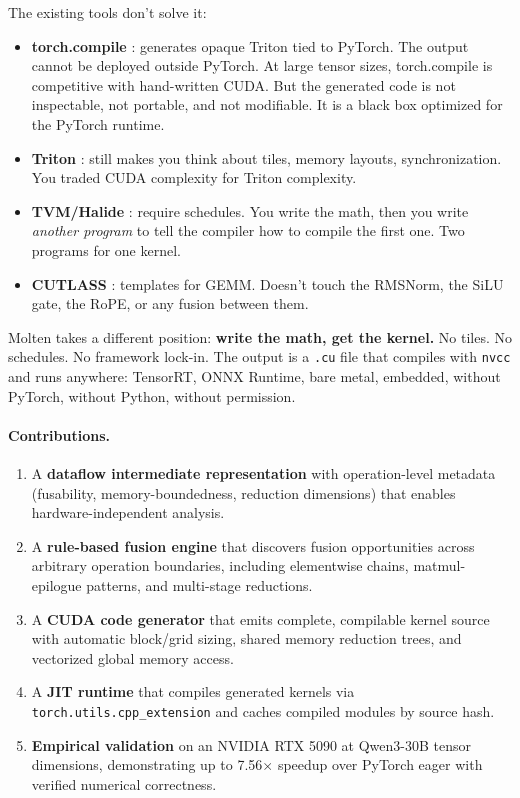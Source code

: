 \documentclass[11pt,a4paper]{article}
\begin{document}
The existing tools don't solve it:

\begin{itemize}
  \item \textbf{torch.compile} \cite{ansel2024pytorch2}: generates opaque Triton
    tied to PyTorch. The output cannot be deployed outside PyTorch. At large
    tensor sizes, torch.compile is competitive with hand-written CUDA. But the
    generated code is not inspectable, not portable, and not modifiable. It is
    a black box optimized for the PyTorch runtime.
  \item \textbf{Triton} \cite{tillet2019triton}: still makes you think about tiles,
    memory layouts, synchronization. You traded CUDA complexity for Triton complexity.
  \item \textbf{TVM/Halide} \cite{chen2018tvm,ragan-kelley2013halide}: require
    schedules. You write the math, then you write \emph{another program} to tell the
    compiler how to compile the first one. Two programs for one kernel.
  \item \textbf{CUTLASS} \cite{kerr2017cutlass}: templates for GEMM. Doesn't touch
    the RMSNorm, the SiLU gate, the RoPE, or any fusion between them.
\end{itemize}

Molten takes a different position: \textbf{write the math, get the kernel.}
No tiles. No schedules. No framework lock-in. The output is a \texttt{.cu} file
that compiles with \texttt{nvcc} and runs anywhere: TensorRT, ONNX Runtime,
bare metal, embedded, without PyTorch, without Python, without permission.

\paragraph{Contributions.}
\begin{enumerate}
  \item A \textbf{dataflow intermediate representation} with operation-level
    metadata (fusability, memory-boundedness, reduction dimensions) that enables
    hardware-independent analysis.
  \item A \textbf{rule-based fusion engine} that discovers fusion opportunities
    across arbitrary operation boundaries, including elementwise chains,
    matmul-epilogue patterns, and multi-stage reductions.
  \item A \textbf{CUDA code generator} that emits complete, compilable kernel
    source with automatic block/grid sizing, shared memory reduction trees,
    and vectorized global memory access.
  \item A \textbf{JIT runtime} that compiles generated kernels via
    \texttt{torch.utils.cpp\_extension} and caches compiled modules by source hash.
  \item \textbf{Empirical validation} on an NVIDIA RTX 5090 at Qwen3-30B
    tensor dimensions, demonstrating up to 7.56$\times$ speedup over PyTorch
    eager with verified numerical correctness.
\end{enumerate}
\end{document}

